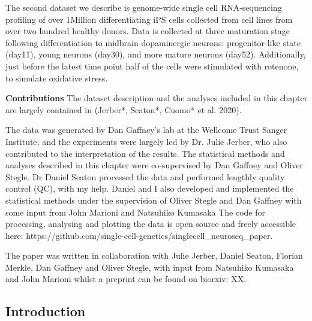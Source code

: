 The second dataset we describe is genome-wide single cell RNA-sequencing profiling of over 1Million differentiating iPS cells collected from cell lines from over two hundred healthy donors. Data is collected at three maturation stage following differentiation to midbrain dopaminergic neurons: progenitor-like state (day11), young neurons (day30), and more mature neurons (day52). Additionally, just before the latest time point half of the cells were stimulated with rotenone, to simulate oxidative stress. 

\vspace{5mm}

\begin{Abstract}

\hspace{-3mm}\textbf{Contributions} The dataset description and the analyses included in this chapter are largely contained in (Jerber*, Seaton*, Cuomo* et al. 2020).

\vspace{5mm}

The data was generated by Dan Gaffney’s lab at the Wellcome Trust Sanger Institute, and the experiments were largely led by Dr. Julie Jerber, who also contributed to the interpretation of the results. The statistical methods and analyses described in this chapter were co-supervised by Dan Gaffney and Oliver Stegle. Dr Daniel Seaton processed the data and performed lengthly quality control (QC), with my help. Daniel and I also developed and implemented the statistical methods under the supervision of Oliver Stegle and Dan Gaffney with some input from John Marioni and Natsuhiko Kumasaka The code for processing, analysing and plotting the data is open source and freely accessible here: https://github.com/single-cell-genetics/singlecell\_neuroseq\_paper.

\vspace{5mm}

The paper was written in collaboration with Julie Jerber, Daniel Seaton, Florian Merkle, Dan Gaffney and Oliver Stegle, with input from Natsuhiko Kumasaka and John Marioni whilst a preprint can be found on biorxiv: XX.

\end{Abstract}

\subsection{Introduction}

